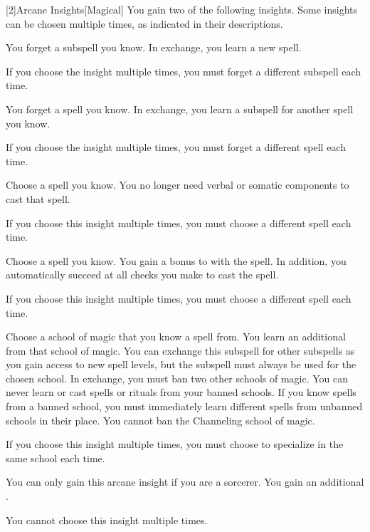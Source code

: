         [2]{Arcane Insights}[Magical]
        You gain two of the following insights.
        Some insights can be chosen multiple times, as indicated in their descriptions.

        {
             You forget a subspell you know.
            In exchange, you learn a new spell.
            \par If you choose the insight multiple times, you must forget a different subspell each time.

             You forget a spell you know.
            In exchange, you learn a subspell for another spell you know.
            \par If you choose the insight multiple times, you must forget a different spell each time.

             Choose a spell you know.
            You no longer need verbal or somatic components to cast that spell.
            \par If you choose this insight multiple times, you must choose a different spell each time.

             Choose a spell you know.
            You gain a  bonus to  with the spell.
            In addition, you automatically succeed at all  checks you make to cast the spell.
            \par If you choose this insight multiple times, you must choose a different spell each time.

             Choose a school of magic that you know a spell from.
            You learn an additional  from that school of magic.
            You can exchange this subspell for other subspells as you gain access to new spell levels, but the subspell must always be used for the chosen school.
            In exchange, you must ban two other schools of magic.
            You can never learn or cast spells or rituals from your banned schools.
            If you know spells from a banned school, you must immediately learn different spells from unbanned schools in their place.
            You cannot ban the Channeling school of magic.
            \par If you choose this insight multiple times, you must choose to specialize in the same school each time.

             You can only gain this arcane insight if you are a sorcerer.
            You gain an additional .
            \par You cannot choose this insight multiple times.

}
